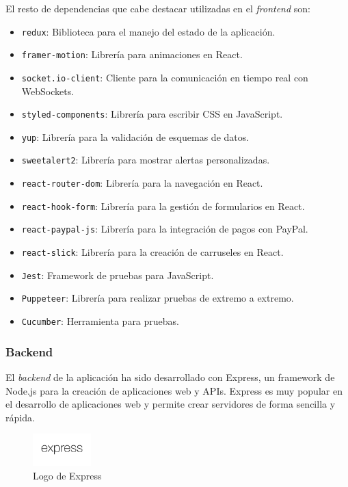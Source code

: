 El resto de dependencias que cabe destacar utilizadas en el \textit{frontend} son:
\begin{itemize}
        \item \texttt{redux}: Biblioteca para el manejo del estado de la aplicación.
        \item \texttt{framer-motion}: Librería para animaciones en React.
        \item \texttt{socket.io-client}: Cliente para la comunicación en tiempo real con WebSockets.
        \item \texttt{styled-components}: Librería para escribir CSS en JavaScript.
        \item \texttt{yup}: Librería para la validación de esquemas de datos.
        \item \texttt{sweetalert2}: Librería para mostrar alertas personalizadas.
        \item \texttt{react-router-dom}: Librería para la navegación en React.
        \item \texttt{react-hook-form}: Librería para la gestión de formularios en React.
        \item \texttt{react-paypal-js}: Librería para la integración de pagos con PayPal.
        \item \texttt{react-slick}: Librería para la creación de carruseles en React.
        \item \texttt{Jest}: Framework de pruebas para JavaScript.
        \item \texttt{Puppeteer}: Librería para realizar pruebas de extremo a extremo.
        \item \texttt{Cucumber}: Herramienta para pruebas.
\end{itemize}



\subsubsection{Backend}
El \textit{backend} de la aplicación ha sido desarrollado con Express, un framework de Node.js para la creación de aplicaciones web y APIs.
Express es muy popular en el desarrollo de aplicaciones web y permite crear servidores de forma sencilla y rápida.

\begin{figure}[H]
    \centering
    \includegraphics[width=0.2\textwidth]{figures/7-Construccion/express.png}
    \caption{Logo de Express}
\end{figure}

